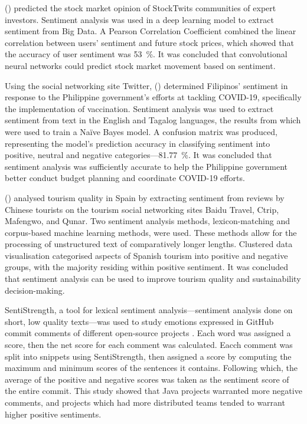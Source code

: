 \documentclass[12pt, a4paper, oneside]{pancake-article}
\begin{document}
\citeauthor{stock} (\citeyear{stock}) predicted the stock market
opinion of StockTwits communities of expert
investors. Sentiment analysis was used in a deep learning model to
extract sentiment from Big Data.
A Pearson Correlation Coefficient combined the linear correlation
between users' sentiment and
future stock prices, which showed that the accuracy of user sentiment
was \qty{53}{\percent}. It was
concluded that convolutional neural networks could predict stock
market movement based on
sentiment.

Using the social networking site Twitter, \citeauthor{twitter}
(\citeyear{twitter}) determined
Filipinos' sentiment in response to the Philippine government's
efforts at tackling COVID-19,
specifically the implementation of vaccination. Sentiment analysis
was used to extract sentiment
from text in the English and Tagalog languages, the results from
which were used to train a Naïve
Bayes model. A confusion matrix was produced, representing the
model's prediction accuracy
in classifying sentiment into positive, neutral and negative
categories---\qty{81.77}{\percent}.
It was concluded that sentiment analysis was sufficiently accurate to
help the Philippine government
better conduct budget planning and coordinate COVID-19 efforts.

\citeauthor{spain} (\citeyear{spain}) analysed tourism quality in Spain
by extracting sentiment from reviews by Chinese tourists on the tourism
social networking sites Baidu Travel, Ctrip, Mafengwo, and Qunar.
Two sentiment analysis methods, lexicon-matching and corpus-based machine
learning methods, were used. These methods allow for the processing of
unstructured text of comparatively longer lengths. Clustered data
visualisation categorised aspects of Spanish tourism into positive
and negative groups, with the majority residing within positive sentiment.
It was concluded that sentiment analysis can be used to improve tourism
quality and sustainability decision-making.

SentiStrength, a tool for lexical sentiment analysis---sentiment analysis
done on short, low quality texts---was used to study emotions expressed
in GitHub commit comments of different open-source projects \cite{github}.
Each word was assigned a score, then the net score for each comment
was calculated.
Eacch comment was split into snippets using SentiStrength, then
assigned a score by
computing the maximum and minimum scores of the sentences it contains.
Following which, the average of the positive and negative scores was
taken as the
sentiment score of the entire commit. This study showed that Java
projects warranted
more negative comments, and projects which had more distributed teams tended
to warrant higher positive sentiments.
\end{document}
